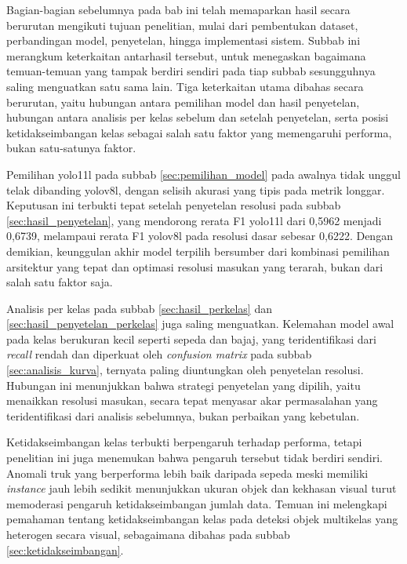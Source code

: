 Bagian-bagian sebelumnya pada bab ini telah memaparkan hasil secara berurutan mengikuti 
tujuan penelitian, mulai dari pembentukan dataset, perbandingan model, penyetelan, hingga 
implementasi sistem. Subbab ini merangkum keterkaitan antarhasil tersebut, untuk menegaskan 
bagaimana temuan-temuan yang tampak berdiri sendiri pada tiap subbab sesungguhnya saling 
menguatkan satu sama lain. Tiga keterkaitan utama dibahas secara berurutan, yaitu hubungan 
antara pemilihan model dan hasil penyetelan, hubungan antara analisis per kelas sebelum dan 
setelah penyetelan, serta posisi ketidakseimbangan kelas sebagai salah satu faktor yang 
memengaruhi performa, bukan satu-satunya faktor.

Pemilihan yolo11l pada subbab \ref{sec:pemilihan_model} pada awalnya tidak unggul telak 
dibanding yolov8l, dengan selisih akurasi yang tipis pada metrik longgar. Keputusan ini 
terbukti tepat setelah penyetelan resolusi pada subbab \ref{sec:hasil_penyetelan}, yang 
mendorong rerata F1 yolo11l dari 0,5962 menjadi 0,6739, melampaui rerata F1 yolov8l pada 
resolusi dasar sebesar 0,6222. Dengan demikian, keunggulan akhir model terpilih bersumber 
dari kombinasi pemilihan arsitektur yang tepat dan optimasi resolusi masukan yang 
terarah, bukan dari salah satu faktor saja.

Analisis per kelas pada subbab \ref{sec:hasil_perkelas} dan \ref{sec:hasil_penyetelan_perkelas} 
juga saling menguatkan. Kelemahan model awal pada kelas berukuran kecil seperti sepeda dan 
bajaj, yang teridentifikasi dari \textit{recall} rendah dan diperkuat oleh \textit{confusion 
matrix} pada subbab \ref{sec:analisis_kurva}, ternyata paling diuntungkan oleh penyetelan 
resolusi. Hubungan ini menunjukkan bahwa strategi penyetelan yang dipilih, yaitu menaikkan 
resolusi masukan, secara tepat menyasar akar permasalahan yang teridentifikasi dari analisis 
sebelumnya, bukan perbaikan yang kebetulan.

Ketidakseimbangan kelas terbukti berpengaruh terhadap performa, tetapi penelitian ini juga 
menemukan bahwa pengaruh tersebut tidak berdiri sendiri. Anomali truk yang berperforma lebih 
baik daripada sepeda meski memiliki \textit{instance} jauh lebih sedikit menunjukkan ukuran 
objek dan kekhasan visual turut memoderasi pengaruh ketidakseimbangan jumlah data. Temuan 
ini melengkapi pemahaman tentang ketidakseimbangan kelas pada deteksi objek multikelas yang 
heterogen secara visual, sebagaimana dibahas pada subbab \ref{sec:ketidakseimbangan}.

